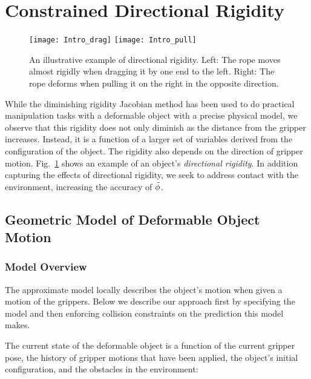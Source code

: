 \section{Constrained Directional Rigidity}
\label{sec:constrained_model}


\begin{figure}[t]
    \centering
    \texttt{[image: Intro\_drag]}\hfill
    \texttt{[image: Intro\_pull]}%
    \caption{An illustrative example of directional rigidity. Left: The rope moves almost rigidly when dragging it by one end to the left. Right: The rope deforms when pulling it on the right in the opposite direction.}
    \label{fig:intro_directional_rigidity}
\end{figure}

While the diminishing rigidity Jacobian method has been used to do practical manipulation tasks with a deformable object with a precise physical model, we observe that this rigidity does not only diminish as the distance from the gripper increases. Instead, it is a function of a larger set of variables derived from the configuration of the object. The rigidity also depends on the direction of gripper motion. Fig.~\ref{fig:intro_directional_rigidity} shows an example of an object's \textit{directional rigidity}. In addition capturing the effects of directional rigidity, we seek to address contact with the environment, increasing the accuracy of $\tilde {\phi}$. 

\subsection{Geometric Model of Deformable Object Motion}

\subsubsection{Model Overview}
The approximate model locally describes the object's motion when given a motion of the grippers. Below we describe our approach first by specifying the model and then enforcing collision constraints on the prediction this model makes.

The current state of the deformable object is a function of the current gripper pose, the history of gripper motions that have been applied, the object's initial configuration, and the obstacles in the environment:

